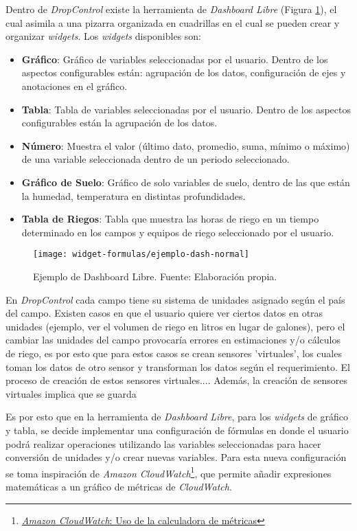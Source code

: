 
Dentro de \textit{DropControl} existe la herramienta de \textit{Dashboard Libre} (Figura \ref{fig:dash-example}), el cual asimila a una pizarra organizada en cuadrillas en el cual se pueden crear y organizar \textit{widgets}.
Los \textit{widgets} disponibles son:
\begin{itemize}
    \item \textbf{Gráfico}: Gráfico de variables seleccionadas por el usuario. Dentro de los aspectos configurables están: agrupación de los datos, configuración de ejes y anotaciones en el gráfico.
    \item \textbf{Tabla}: Tabla de variables seleccionadas por el usuario. Dentro de los aspectos configurables están la agrupación de los datos.
    \item \textbf{Número}: Muestra el valor (último dato, promedio, suma, mínimo o máximo) de una variable seleccionada dentro de un periodo seleccionado.
    \item \textbf{Gráfico de Suelo}: Gráfico de solo variables de suelo, dentro de las que están la humedad, temperatura en distintas profundidades.
    \item \textbf{Tabla de Riegos}: Tabla que muestra las horas de riego en un tiempo determinado en los campos y equipos de riego seleccionado por el usuario.
\end{itemize}

\begin{figure}[H]
	\centering
	\texttt{[image: widget-formulas/ejemplo-dash-normal]}
	\caption{\label{fig:dash-example} Ejemplo de Dashboard Libre. Fuente: Elaboración propia.}
\end{figure}

En \textit{DropControl} cada campo tiene su sistema de unidades asignado según el país del campo. Existen casos en que el usuario quiere ver ciertos datos en otras unidades (ejemplo, ver el volumen de riego en litros en lugar de galones), pero el cambiar las unidades del campo provocaría errores en estimaciones y/o cálculos de riego, es por esto que para estos casos se crean sensores 'virtuales', los cuales toman los datos de otro sensor y transforman los datos según el requerimiento.
El proceso de creación de estos sensores virtuales.... Además, la creación de sensores virtuales implica que se guarda

Es por esto que en la herramienta de \textit{Dashboard Libre}, para los \textit{widgets} de gráfico y tabla, se decide implementar una configuración de fórmulas en donde el usuario podrá realizar operaciones utilizando las variables seleccionadas para hacer conversión de unidades y/o crear nuevas variables.
Para esta nueva configuración se toma inspiración de \textit{Amazon CloudWatch}\footnote{\href{https://docs.aws.amazon.com/es_es/AmazonCloudWatch/latest/monitoring/using-metric-math.html}{\textit{Amazon CloudWatch}: Uso de la calculadora de métricas}}, que permite añadir expresiones matemáticas a un gráfico de métricas de \textit{CloudWatch}.

